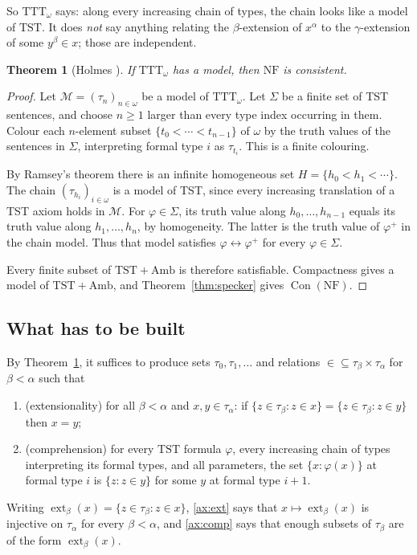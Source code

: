 \documentclass[11pt]{article}
\newtheorem{theorem}{Theorem}[section]
\theoremstyle{definition}
\theoremstyle{remark}
\newcommand{\NF}{\mathrm{NF}}
\newcommand{\TTT}{\mathrm{TTT}}
\newcommand{\TST}{\mathrm{TST}}
\newcommand{\Amb}{\mathrm{Amb}}
\newcommand{\ext}{\operatorname{ext}}
\newcommand{\Con}{\operatorname{Con}}
\newcommand{\calM}{\mathcal M}
\begin{document}
So \(\TTT_\omega\) says: along every increasing chain of types, the
chain looks like a model of \(\TST\). It does \emph{not} say anything
relating the \(\beta\)-extension of \(x^\alpha\) to the
\(\gamma\)-extension of some \(y^\beta\in x\); those are independent.

\begin{theorem}[Holmes \cite{Holmes95}]\label{thm:holmes}
If \(\TTT_\omega\) has a model, then \(\NF\) is consistent.
\end{theorem}
\begin{proof}
Let \(\calM=(\tau_n)_{n\in\omega}\) be a model of \(\TTT_\omega\).
Let \(\Sigma\) be a finite set of TST sentences, and choose \(n\geq1\)
larger than every type index occurring in them. Colour each
\(n\)-element subset \(\{t_0<\cdots<t_{n-1}\}\) of \(\omega\) by the
truth values of the sentences in \(\Sigma\), interpreting formal type
\(i\) as \(\tau_{t_i}\). This is a finite colouring.

By Ramsey's theorem there is an infinite homogeneous set
\(H=\{h_0<h_1<\cdots\}\). The chain \((\tau_{h_i})_{i\in\omega}\)
is a model of TST, since every increasing translation of a TST axiom
holds in \(\calM\). For \(\varphi\in\Sigma\), its truth value along
\(h_0,\ldots,h_{n-1}\) equals its truth value along
\(h_1,\ldots,h_n\), by homogeneity. The latter is the truth value of
\(\varphi^+\) in the chain model. Thus that model satisfies
\(\varphi\leftrightarrow\varphi^+\) for every \(\varphi\in\Sigma\).

Every finite subset of \(\TST+\Amb\) is therefore satisfiable.
Compactness gives a model of \(\TST+\Amb\), and
Theorem~\ref{thm:specker} gives \(\Con(\NF)\).
\end{proof}

\subsection{What has to be built}\label{sec:target}
By Theorem~\ref{thm:holmes}, it suffices to produce sets
\(\tau_0,\tau_1,\dots\) and relations \({\in}\subseteq\tau_\beta\times
\tau_\alpha\) for \(\beta<\alpha\) such that
\begin{enumerate}[nosep,label=(\Alph*)]
\item\label{ax:ext} (extensionality) for all \(\beta<\alpha\) and
 \(x,y\in\tau_\alpha\): if \(\{z\in\tau_\beta:z\in x\}=\{z\in\tau_\beta:
 z\in y\}\) then \(x=y\);
\item\label{ax:comp} (comprehension) for every \(\TST\) formula
 \(\varphi\), every increasing chain of types interpreting its formal
 types, and all parameters, the set \(\{x:\varphi(x)\}\) at formal type
 \(i\) is \(\{z:z\in y\}\) for some \(y\) at formal type \(i+1\).
\end{enumerate}
Writing \(\ext_\beta(x)=\{z\in\tau_\beta:z\in x\}\), \ref{ax:ext} says
that \(x\mapsto\ext_\beta(x)\) is injective on \(\tau_\alpha\) for every
\(\beta<\alpha\), and \ref{ax:comp} says that enough subsets of
\(\tau_\beta\) are of the form \(\ext_\beta(x)\).
\end{document}
